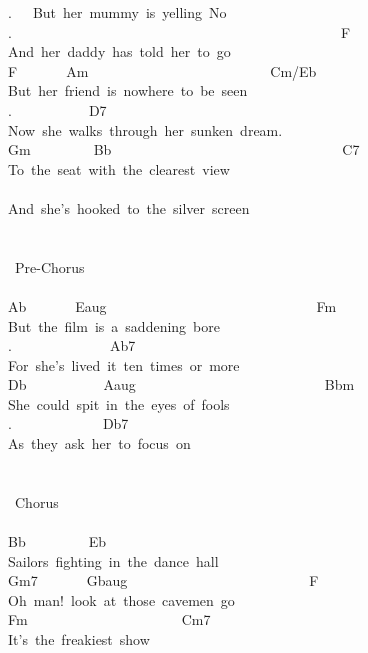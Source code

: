 {.\ \ \ But\ her\ mummy\ is\ yelling\ \;No\;\\
.\ \ \ \ \ \ \ \ \ \ \ \ \ \ \ \ \ \ \ \ \ \ \ \ \ \ \ \ \ \ \ \ \ \ \ \ \ \ \ \ \ \ \ \ \ \ \ F\\
And\ her\ daddy\ has\ told\ her\ to\ go\\
F\ \ \ \ \ \ \ Am\ \ \ \ \ \ \ \ \ \ \ \ \ \ \ \ \ \ \ \ \ \ \ \ \ \ Cm/Eb\\
But\ her\ friend\ is\ nowhere\ to\ be\ seen\\
.\ \ \ \ \ \ \ \ \ \ \ D7\\
Now\ she\ walks\ through\ her\ sunken\ dream.\\
Gm\ \ \ \ \ \ \ \ \ Bb\ \ \ \ \ \ \ \ \ \ \ \ \ \ \ \ \ \ \ \ \ \ \ \ \ \ \ \ \ \ \ \ \ C7\\
To\ the\ seat\ with\ the\ clearest\ view\\
\\
And\ she's\ hooked\ to\ the\ silver\ screen\\
\\
\\
\lbrack\ Pre-Chorus\rbrack\\
\\
Ab\ \ \ \ \ \ \ Eaug\ \ \ \ \ \ \ \ \ \ \ \ \ \ \ \ \ \ \ \ \ \ \ \ \ \ \ \ \ \ Fm\\
But\ the\ film\ is\ a\ saddening\ bore\\
.\ \ \ \ \ \ \ \ \ \ \ \ \ \ Ab7\\
For\ she's\ lived\ it\ ten\ times\ or\ more\\
Db\ \ \ \ \ \ \ \ \ \ \ Aaug\ \ \ \ \ \ \ \ \ \ \ \ \ \ \ \ \ \ \ \ \ \ \ \ \ \ \ Bbm\\
She\ could\ spit\ in\ the\ eyes\ of\ fools\\
.\ \ \ \ \ \ \ \ \ \ \ \ \ Db7\\
As\ they\ ask\ her\ to\ focus\ on\\
\\
\\
\lbrack\ Chorus\rbrack\\
\\
Bb\ \ \ \ \ \ \ \ \ Eb\\
Sailors\ fighting\ in\ the\ dance\ hall\\
Gm7\ \ \ \ \ \ \ Gbaug\ \ \ \ \ \ \ \ \ \ \ \ \ \ \ \ \ \ \ \ \ \ \ \ \ \ F\\
Oh\ man!\ look\ at\ those\ cavemen\ go\\
Fm\ \ \ \ \ \ \ \ \ \ \ \ \ \ \ \ \ \ \ \ \ \ Cm7\\
It's\ the\ freakiest\ show\\
}

